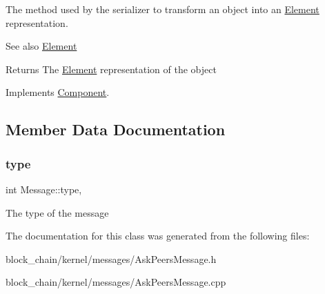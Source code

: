 The method used by the serializer to transform an object into an \mbox{\hyperlink{classElement}{Element}} representation. \begin{DoxySeeAlso}{See also}
\mbox{\hyperlink{classElement}{Element}}
\end{DoxySeeAlso}
\begin{DoxyReturn}{Returns}
The \mbox{\hyperlink{classElement}{Element}} representation of the object 
\end{DoxyReturn}


Implements \mbox{\hyperlink{classComponent_a3e63d8c993e417a4af3f56d65ebfc7ea}{Component}}.



\subsection{Member Data Documentation}
\mbox{\label{classMessage_afbfb481c98b13d0deba0bac443bebe29}} 
\subsubsection{\texorpdfstring{type}{type}}
{\footnotesize\ttfamily int Message\+::type\hspace{0.3cm}{\ttfamily [protected]}, {\ttfamily [inherited]}}

The type of the message 

The documentation for this class was generated from the following files\+:\begin{DoxyCompactItemize}
\item 
block\+\_\+chain/kernel/messages/Ask\+Peers\+Message.\+h\item 
block\+\_\+chain/kernel/messages/Ask\+Peers\+Message.\+cpp\end{DoxyCompactItemize}
